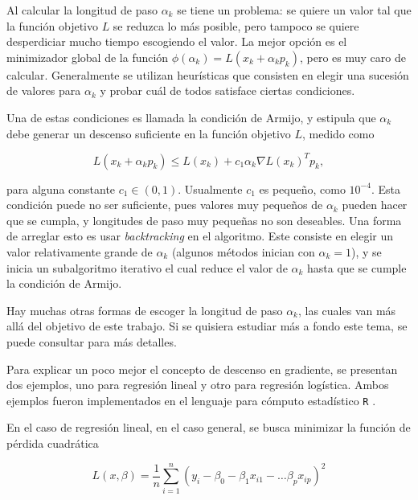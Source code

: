 

Al calcular la longitud de paso $\alpha_k$ se tiene un problema: se quiere un valor tal que la función objetivo $L$ se reduzca lo más posible, pero tampoco se quiere desperdiciar mucho tiempo escogiendo el valor. La mejor opción es el minimizador global de la función $\phi(\alpha_k) = L(x_k + \alpha_k p_k)$, pero es muy caro de calcular. Generalmente se utilizan heurísticas que consisten en elegir una sucesión de valores para $\alpha_k$ y probar cuál de todos satisface ciertas condiciones.

Una de estas condiciones es llamada la condición de Armijo, y estipula que $\alpha_k$ debe generar un descenso suficiente en la función objetivo $L$, medido como

$$
  L(x_k + \alpha_k p_k) \leq L(x_k) + c_1 \alpha_k \nabla L(x_k)^T p_k,
$$

para alguna constante $c_1 \in (0, 1)$. Usualmente $c_1$ es pequeño, como $10^{-4}$. Esta condición puede no ser suficiente, pues valores muy pequeños de $\alpha_k$ pueden hacer que se cumpla, y longitudes de paso muy pequeñas no son deseables. Una forma de arreglar esto es usar \textit{backtracking} en el algoritmo. Este consiste en elegir un valor relativamente grande de $\alpha_k$ (algunos métodos inician con $\alpha_k = 1$), y se inicia un subalgoritmo iterativo el cual reduce el valor de $\alpha_k$ hasta que se cumple la condición de Armijo.

Hay muchas otras formas de escoger la longitud de paso $\alpha_k$, las cuales van más allá del objetivo de este trabajo. Si se quisiera estudiar más a fondo este tema, se puede consultar \cite{nocedal2006numerical} para más detalles.

Para explicar un poco mejor el concepto de descenso en gradiente, se presentan dos ejemplos, uno para regresión lineal y otro para regresión logística. Ambos ejemplos fueron implementados en el lenguaje para cómputo estadístico \texttt{R} \cite{R_manual}.

En el caso de regresión lineal, en el caso general, se busca minimizar la función de pérdida cuadrática

\begin{equation}
  \label{eq:perd_cuadratica_reg_lineal}
  L(x, \beta) = \frac{1}{n} \sum_{i = 1}^n \left( y_i - \beta_0 - \beta_1 x_{i1} - \hdots  \beta_p x_{ip} \right)^2
\end{equation}

